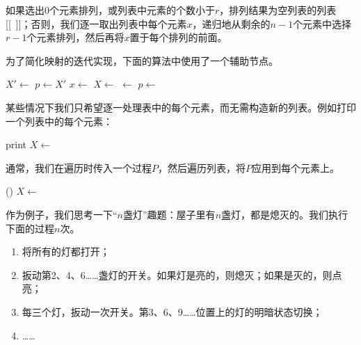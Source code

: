 \documentclass[b5paper]{ctexart}
\begin{document}
\be
{}
\ee

如果选出0个元素排列，或列表中元素的个数小于$r$，排列结果为空列表的列表[[\ ]]；否则，我们逐一取出列表中每个元素$x$，递归地从剩余的$n-1$个元素中选择$r-1$个元素排列，然后再将$x$置于每个排列的前面。

为了简化映射的迭代实现，下面的算法中使用了一个辅助节点。

\begin{algorithmic}[1]
  \State $X' \gets$  
  \State $p \gets X'$
    \State $x \gets$ 
    \State $X \gets$ 
    \State {} $\gets$ 
    \State $p \gets$ 
  \EndWhile
  \State \Return {} 
\EndFunction
\end{algorithmic}

某些情况下我们只希望逐一处理表中的每个元素，而无需构造新的列表。例如打印一个列表中的每个元素：

\begin{algorithmic}[1]
    \State print 
    \State $X \gets$ 
  \EndWhile
\EndFunction
\end{algorithmic}

通常，我们在遍历时传入一个过程$P$，然后遍历列表，将$P$应用到每个元素上。

\begin{algorithmic}[1]
    \State {}()
    \State $X \gets$ 
  \EndWhile
\EndFunction
\end{algorithmic}

作为例子，我们思考一下“$n$盏灯”趣题\cite{poj-drunk-jailer}：屋子里有$n$盏灯，都是熄灭的。我们执行下面的过程$n$次。

\begin{enumerate}
\item 将所有的灯都打开；
\item 扳动第2、4、6……盏灯的开关。如果灯是亮的，则熄灭；如果是灭的，则点亮；
\item 每三个灯，扳动一次开关。第3、6、9……位置上的灯的明暗状态切换；
\item ……
\end{enumerate}
\end{document}
